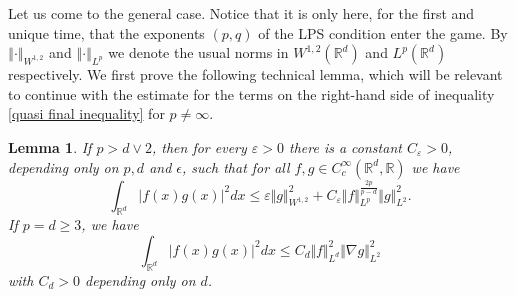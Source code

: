 \documentclass[a4paper,10pt]{article}
\newtheorem{lemma}[theorem]{Lemma}
\begin{document}
Let us come to the general case. Notice that it is only here, for the first
and unique time, that the exponents $(p,q)$ of the LPS condition
enter the game. By $\left\Vert \cdot\right\Vert _{W^{1,2}}$ and $\left\Vert
\cdot\right\Vert _{L^{p}}$ we denote the usual norms in $W^{1,2}(
\mathbb{R}^{d})$ and $L^{p}(\mathbb{R}^{d})$ respectively. We first prove the following technical lemma, which will be relevant to continue with the estimate for the terms on the right-hand side of inequality \eqref{quasi final inequality} for $p \neq \infty$.

\begin{lemma}
\label{lemma interpolation}If $p>d\vee2$, then for every $\varepsilon>0$ there
is a constant $C_{\varepsilon}>0$, depending only on $p,d$ and $\epsilon$, such that for all $f,g\in C_{c}^{\infty
}(\mathbb{R}^{d},\mathbb{R})$ we have 
\begin{equation}
\int_{\mathbb{R}^{d}}\vert f(x)  g(x) \vert^{2}dx\leq\varepsilon \Vert g\Vert_{W^{1,2}} 
^{2}+C_{\varepsilon} \Vert f \Vert_{L^{p}}^{\frac{2p}{p-d} 
} \Vert g \Vert_{L^{2}}^{2}. \label{interpol ineq} 
\end{equation}
If $p=d\geq3$, we have
\begin{equation}
\int_{\mathbb{R}^{d}} \vert f(x)  g(x)
 \vert^{2}dx\leq C_{d} \Vert f \Vert _{L^{d}}^{2} \Vert
\nabla g \Vert _{L^{2}}^{2} \label{interpol ineq p=d} 
\end{equation}
with $C_{d}>0$ depending only on $d$.
\end{lemma}
\end{document}

